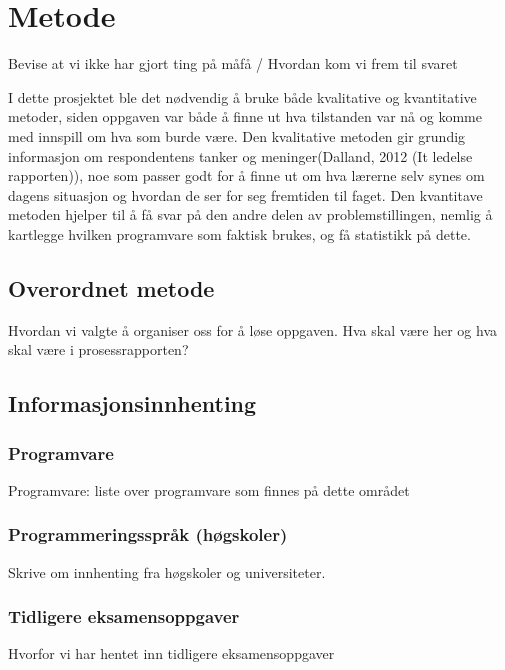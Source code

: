\cleardoublepage
\chapter{Metode}
\label{chap:metode} 

{\color{red} Bevise at vi ikke har gjort ting på måfå / Hvordan kom vi frem til svaret }

I dette prosjektet ble det nødvendig å bruke både kvalitative og kvantitative metoder, siden oppgaven var både å finne ut hva tilstanden var nå og komme med innspill om hva som burde være. Den kvalitative metoden gir grundig informasjon om respondentens tanker og meninger(Dalland, 2012 (It ledelse rapporten)), noe som passer godt for å finne ut om hva lærerne selv synes om dagens situasjon og hvordan de ser for seg fremtiden til faget. Den kvantitave metoden hjelper til å få svar på den andre delen av problemstillingen, nemlig å kartlegge hvilken programvare som faktisk brukes, og få statistikk på dette.

\section{Overordnet metode}
{\color{red} Hvordan vi valgte å organiser oss for å løse oppgaven.} Hva skal være her og hva skal være i prosessrapporten? 


\section {Informasjonsinnhenting}

\subsection {Programvare}
{\color {red} Programvare: liste over programvare som finnes på dette området }





\subsection {Programmeringsspråk {\color {red} (høgskoler)}}
{\color{red} Skrive om innhenting fra høgskoler og universiteter. }
\subsection {Tidligere eksamensoppgaver}
{\color {red} Hvorfor vi har hentet inn tidligere eksamensoppgaver}

